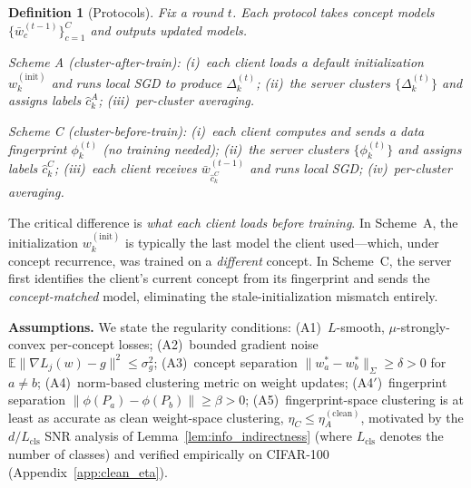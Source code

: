 \documentclass[11pt]{article}
\newcommand{\E}{\mathbb{E}}
\newcommand{\wstar}{w^*}
\newcommand{\wbar}{\bar{w}}
\newtheorem{definition}[theorem]{Definition}
\begin{document}
\begin{definition}[Protocols]
\label{def:protocols}
Fix a round $t$. Each protocol takes concept models $\{\wbar_c^{(t-1)}\}_{c=1}^C$ and outputs updated models.

\emph{Scheme A} (cluster-after-train): (i)~each client loads a default initialization $w_k^{(\mathrm{init})}$ and runs local SGD to produce $\Delta_k^{(t)}$; (ii)~the server clusters $\{\Delta_k^{(t)}\}$ and assigns labels $\hat c_k^A$; (iii)~per-cluster averaging.

\emph{Scheme C} (cluster-before-train): (i)~each client computes and sends a data fingerprint $\phi_k^{(t)}$ (no training needed); (ii)~the server clusters $\{\phi_k^{(t)}\}$ and assigns labels $\hat c_k^C$; (iii)~each client receives $\wbar_{\hat c_k^C}^{(t-1)}$ and runs local SGD; (iv)~per-cluster averaging.
\end{definition}

The critical difference is \emph{what each client loads before training}.
In Scheme~A, the initialization $w_k^{(\mathrm{init})}$ is typically the last model the client used---which, under concept recurrence, was trained on a \emph{different} concept.
In Scheme~C, the server first identifies the client's current concept from its fingerprint and sends the \emph{concept-matched} model, eliminating the stale-initialization mismatch entirely.

\textbf{Assumptions.}
We state the regularity conditions:
(A1)~$L$-smooth, $\mu$-strongly-convex per-concept losses;
(A2)~bounded gradient noise $\E\|\nabla L_j(w) - g\|^2 \le \sigma_g^2$;
(A3)~concept separation $\|\wstar_a - \wstar_b\|_\Sigma \ge \delta > 0$ for $a \ne b$;
(A4)~norm-based clustering metric on weight updates;
(A4$'$)~fingerprint separation $\|\phi(P_a) - \phi(P_b)\| \ge \beta > 0$;
(A5)~fingerprint-space clustering is at least as accurate as clean weight-space clustering, $\eta_C \le \eta_A^{(\mathrm{clean})}$, motivated by the $d/L_{\mathrm{cls}}$ SNR analysis of Lemma~\ref{lem:info_indirectness} (where $L_{\mathrm{cls}}$ denotes the number of classes) and verified empirically on CIFAR-100 (Appendix~\ref{app:clean_eta}).
\end{document}
